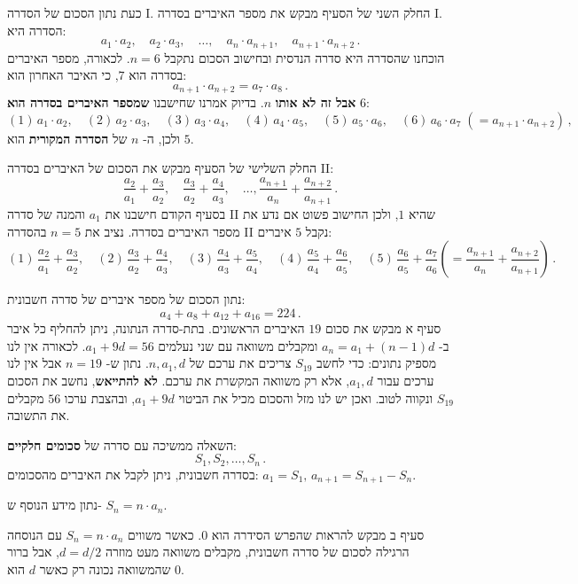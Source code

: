 \documentclass[12pt,a4paper]{article}
\begin{document}
כעת נתון הסכום של הסדרה I. החלק השני של הסעיף מבקש את מספר האיברים בסדרה I. הסדרה היא: 
\[
a_1\cdot a_2,\quad a_2\cdot a_3,\quad \ldots,\quad a_n\cdot a_{n+1},\quad a_{n+1} \cdot a_{n+2}\,.
\]
הוכחנו שהסדרה היא סדרה הנדסית ובחישוב הסכום נתקבל
$n=6$.
לכאורה, מספר האיברים בסדרה הוא
$7$,
כי האיבר האחרון הוא:
\[
a_{n+1} \cdot a_{n+2} = a_{7} \cdot a_{8}\,.
\]
\textbf{אבל זה לא אותו}
$n$.
בדיוק אמרנו שחישבנו
\textbf{שמספר האיברים בסדרה הוא}
$6$:
\[
(1)\, a_1\cdot a_2,\quad (2)\,a_2\cdot a_3,\quad(3)\, a_3\cdot a_4,\quad (4)\,a_4\cdot a_5,\quad (5)\,a_5\cdot a_6,\quad (6)\,a_6\cdot a_7 \;(= a_{n+1}\cdot a_{n+2})\,,
\]
ולכן, ה-%
$n$
של
\textbf{הסדרה המקורית}
הוא
$5$.

החלק השלישי של הסעיף מבקש את הסכום של האיברים בסדרה II:
\[
\frac{a_2}{a_1}+\frac{a_3}{a_2},\quad
\frac{a_3}{a_2}+\frac{a_4}{a_3},\quad
\ldots,
\frac{a_{n+1}}{a_n}+\frac{a_{n+2}}{a_{n+1}}\,.
\]
בסעיף הקודם חישבנו את
$a_1$
והמנה של סדרה II שהיא
$1$,
ולכן החישוב פשוט אם נדע את מספר האיברים בסדרה. נציב את
$n=5$
בהסדרה II נקבל
$5$
איברים:
\[
(1)\,\frac{a_2}{a_1}+\frac{a_3}{a_2},\quad
(2)\,\frac{a_3}{a_2}+\frac{a_4}{a_3},\quad
(3)\,\frac{a_4}{a_3}+\frac{a_5}{a_4},\quad
(4)\,\frac{a_5}{a_4}+\frac{a_6}{a_5},\quad
(5)\,\frac{a_6}{a_5}+\frac{a_7}{a_6} \left(= \frac{a_{n+1}}{a_n}+\frac{a_{n+2}}{a_{n+1}}\right)\,.
\]
\vspace{-2ex}
\bigskip

\textbf{}
נתון הסכום של מספר איברים של סדרה חשבונית:
\[
a_4+a_8+a_{12}+a_{16}=224\,.
\]
סעיף א מבקש את סכום 
$19$
האיברים הראשונים. בתת-סדרה הנתונה, ניתן להחליף כל איבר ב-%
$a_n=a_1+(n-1)d$
ומקבלים משוואה עם שני נעלמים
$a_1+9d=56$.
לכאורה אין לנו מספיק נתונים: כדי לחשב
$S_{19}$
צריכים את ערכם של
$n, a_1, d$.
נתון ש-%
$n=19$
אבל אין לנו ערכים עבור 
$a_1, d$,
אלא רק משוואה המקשרת את ערכם.
\textbf{לא להתייאש},
נחשב את הסכום
$S_{19}$
ונקווה לטוב. ואכן יש לנו מזל והסכום מכיל את הביטוי 
$a_1+9d$,
ובהצבת ערכו
$56$
מקבלים את התשובה.

השאלה ממשיכה עם סדרה של
\textbf{סכומים חלקיים}:
\[
S_1, S_2, \ldots, S_n\,.
\]
בסדרה חשבונית, ניתן לקבל את האיברים מהסכומים:
$a_1 = S_1,\,a_{n+1}=S_{n+1}-S_n$.

נתון מידע הנוסף ש-%
$S_n=n\cdot a_n$.

סעיף ב מבקש להראות שהפרש הסידרה הוא
$0$.
כאשר משווים 
$S_n=n\cdot a_n$
עם הנוסחה הרגילה לסכום של סדרה חשבונית, מקבלים משוואה מעט מוזרה
$d=d/2$,
אבל ברור שהמשוואה נכונה רק כאשר
$d$
הוא
$0$.
\end{document}
